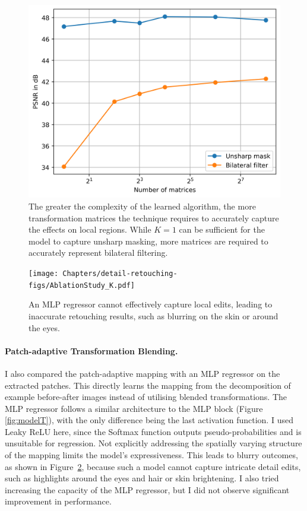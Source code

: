 \begin{figure}[th] %
    \centering
	\includegraphics[width=0.6\columnwidth]{Chapters/detail-retouching-figs/ablation_matrices.png}

    \caption{The greater the complexity of the learned algorithm, the more transformation matrices the technique requires to accurately capture the effects on local regions. While $K=1$ can be sufficient for the model to capture unsharp masking, more matrices are required to accurately represent bilateral filtering.}

    \label{fig:ablation_K}
\end{figure}

\begin{figure}%
\centering
\texttt{[image: Chapters/detail-retouching-figs/AblationStudy\_K.pdf]}
    \caption{An MLP regressor cannot effectively capture local edits, leading to inaccurate retouching results, such as blurring on the skin or around the eyes.}

\label{fig:ablation_MLP}
\end{figure}
\paragraph{Patch-adaptive Transformation Blending.} I also compared the patch-adaptive mapping with an \gls{MLP} regressor on the extracted patches. This directly learns the mapping from the decomposition of example before-after images instead of utilising blended transformations. The \gls{MLP} regressor follows a similar architecture to the \gls{MLP} block (Figure \ref{fig:modelT}), with the only difference being the last activation function. I used Leaky \gls{ReLU} here, since the Softmax function outputs pseudo-probabilities and is unsuitable for regression. Not explicitly addressing the spatially varying structure of the mapping limits the model’s expressiveness. This leads to blurry outcomes, as shown in Figure~\ref{fig:ablation_MLP}, because such a model cannot capture intricate detail edits, such as highlights around the eyes and hair or skin brightening. I also tried increasing the capacity of the \gls{MLP} regressor, but I did not observe significant improvement in performance.



